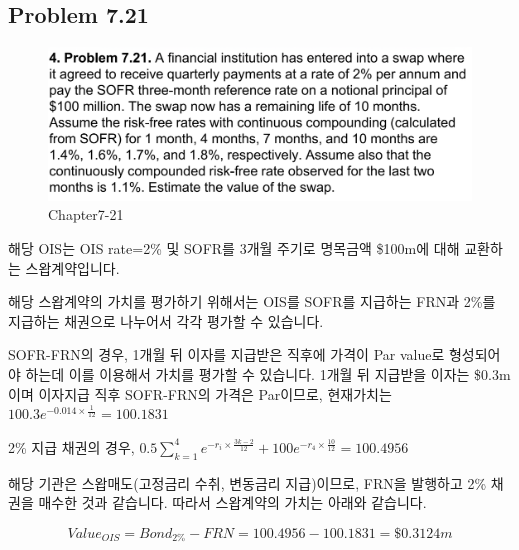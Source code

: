 \documentclass[
  letterpaper,
  DIV=11,
  numbers=noendperiod]{scrreprt}
\begin{document}
\subsection*{\texorpdfstring{\textbf{Problem
7.21}}{Problem 7.21}}\label{problem-7.21}

\begin{figure}[H]

{\centering \includegraphics{images/선물옵션_7-21.png}

}

\caption{Chapter7-21}

\end{figure}%

해당 OIS는 OIS rate=2\% 및 SOFR를 3개월 주기로 명목금액 \$100m에 대해
교환하는 스왑계약입니다.

해당 스왑계약의 가치를 평가하기 위해서는 OIS를 SOFR를 지급하는 FRN과
2\%를 지급하는 채권으로 나누어서 각각 평가할 수 있습니다.

SOFR-FRN의 경우, 1개월 뒤 이자를 지급받은 직후에 가격이 Par value로
형성되어야 하는데 이를 이용해서 가치를 평가할 수 있습니다. 1개월 뒤
지급받을 이자는 \$0.3m이며 이자지급 직후 SOFR-FRN의 가격은 Par이므로,
현재가치는 \(100.3e^{-0.014\times\frac{1}{12}}=100.1831\)

2\% 지급 채권의 경우,
\(0.5\sum_{k=1}^4e^{-r_i\times\frac{3k-2}{12}}+100e^{-r_4\times\frac{10}{12}}=100.4956\)

해당 기관은 스왑매도(고정금리 수취, 변동금리 지급)이므로, FRN을 발행하고
2\% 채권을 매수한 것과 같습니다. 따라서 스왑계약의 가치는 아래와
같습니다.

\[Value_{OIS}=Bond_{2\%}-FRN=100.4956-100.1831=\$0.3124m\]
\end{document}
